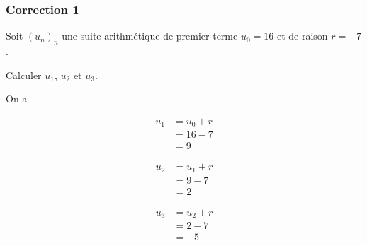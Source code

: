 \documentclass[15pt, mathserif]{beamer}
\begin{document}
\begin{frame}
\vspace{-10mm}
	\frametitle{Correction 1}
Soit $(u_n)_n$ une suite arithmétique de premier terme $u_0=16$ et de raison $r=-7$. 
 
 Calculer $u_1$, $u_2$ et $u_3$. 
 
 On a 
 \begin{minipage}{0.25\textwidth} 
 
 \begin{align*} 
 u_1 &= u_0+r \\ &= 16-7 \\ &=9
 \end{align*} 
  
 \end{minipage} \hfil \begin{minipage}{0.25\textwidth} 
 
 \begin{align*} 
 u_2 &= u_1+r \\ &= 9-7 \\ &=2
 \end{align*} 
 
 \end{minipage} \hfil \begin{minipage}{0.25\textwidth} 
 
 \begin{align*} 
 u_3 &= u_2+r \\ &= 2-7 \\ &=-5
 \end{align*} 
 
 \end{minipage} 
\end{frame}
\end{document}
